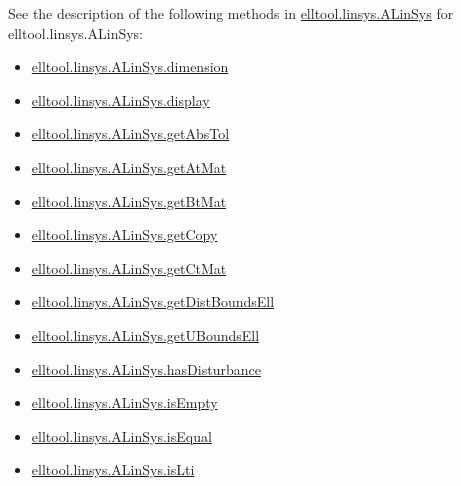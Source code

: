\documentclass[letterpaper,10pt,english]{sphinxmanual}
\begin{document}
See the description of the following methods in {\hyperref[chap_functions:elltool-linsys-alinsys]{elltool.linsys.ALinSys}} for elltool.linsys.ALinSys:
\begin{itemize}
\item {} 
{\hyperref[chap_functions:elltool-linsys-alinsys-dimension]{elltool.linsys.ALinSys.dimension}}

\item {} 
{\hyperref[chap_functions:elltool-linsys-alinsys-display]{elltool.linsys.ALinSys.display}}

\item {} 
{\hyperref[chap_functions:elltool-linsys-alinsys-getabstol]{elltool.linsys.ALinSys.getAbsTol}}

\item {} 
{\hyperref[chap_functions:elltool-linsys-alinsys-getatmat]{elltool.linsys.ALinSys.getAtMat}}

\item {} 
{\hyperref[chap_functions:elltool-linsys-alinsys-getbtmat]{elltool.linsys.ALinSys.getBtMat}}

\item {} 
{\hyperref[chap_functions:elltool-linsys-alinsys-getcopy]{elltool.linsys.ALinSys.getCopy}}

\item {} 
{\hyperref[chap_functions:elltool-linsys-alinsys-getctmat]{elltool.linsys.ALinSys.getCtMat}}

\item {} 
{\hyperref[chap_functions:elltool-linsys-alinsys-getdistboundsell]{elltool.linsys.ALinSys.getDistBoundsEll}}

\item {} 
{\hyperref[chap_functions:elltool-linsys-alinsys-getuboundsell]{elltool.linsys.ALinSys.getUBoundsEll}}

\item {} 
{\hyperref[chap_functions:elltool-linsys-alinsys-hasdisturbance]{elltool.linsys.ALinSys.hasDisturbance}}

\item {} 
{\hyperref[chap_functions:elltool-linsys-alinsys-isempty]{elltool.linsys.ALinSys.isEmpty}}

\item {} 
{\hyperref[chap_functions:elltool-linsys-alinsys-isequal]{elltool.linsys.ALinSys.isEqual}}

\item {} 
{\hyperref[chap_functions:elltool-linsys-alinsys-islti]{elltool.linsys.ALinSys.isLti}}

\end{itemize}
\end{document}
